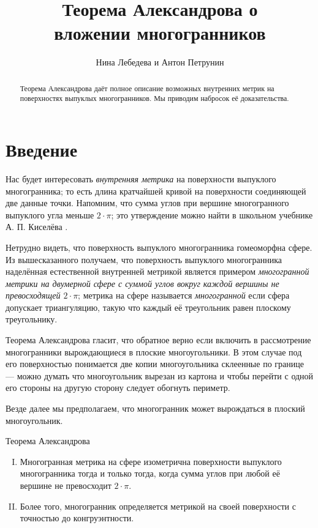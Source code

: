 \documentclass[oneside,a4paper]{article}
\begin{document}

\title{Теорема Александрова о\\ вложении многогранников}
\author{Нина Лебедева и Антон Петрунин}
\date{}
\maketitle

\begin{abstract}
Теорема Александрова даёт полное описание возможных внутренних метрик на поверхностях выпуклых многогранников.
Мы приводим набросок её доказательства.
\end{abstract}

\section{Введение}

Нас будет интересовать \emph{внутренняя метрика} на поверхности выпуклого многогранника;
то есть длина кратчайшей кривой на поверхности соединяющей две данные точки.
Напомним, что сумма углов при вершине многогранного выпуклого угла меньше $2\cdot \pi$; 
это утверждение можно найти в школьном учебнике А. П. Киселёва \cite[§~325]{kiselyov}.

Нетрудно видеть, что поверхность выпуклого многогранника гомеоморфна сфере.
Из вышесказанного получаем, что поверхность выпуклого многогранника наделённая естественной внутренней метрикой
является примером \emph{многогранной метрики на двумерной сфере с суммой углов вокруг каждой вершины не превосходящей $2\cdot\pi$}; 
метрика на сфере называется \emph{многогранной} если сфера допускает триангуляцию, 
такую что каждый её треугольник равен плоскому треугольнику.

Теорема Александрова гласит, что обратное верно если включить в рассмотрение многогранники вырождающиеся в плоские многоугольники.
В этом случае под его поверхностью понимается две копии многоугольника склеенные по границе
--- можно думать что многоугольник вырезан из картона и чтобы перейти с одной его стороны на другую сторону следует обогнуть периметр.

Везде далее мы предполагаем, что многогранник может вырождаться в плоский многоугольник.

\begin{thm}{Теорема Александрова}
\begin{enumerate}[I.]
\item\label{thm:exist} Многогранная метрика на сфере изометрична поверхности выпуклого многогранника тогда и только тогда, когда сумма углов при любой её вершине не превосходит $2\cdot\pi$.

\item\label{thm:unique} Более того, многогранник определяется метрикой на своей поверхности с точностью до конгруэнтности.
\end{enumerate}

\end{thm}
\end{document}
